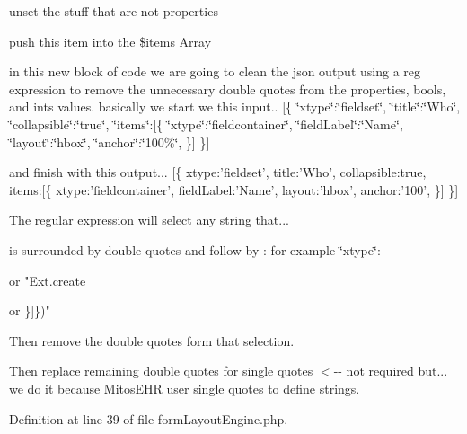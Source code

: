 unset the stuff that are not properties

push this item into the \$items \-Array

in this new block of code we are going to clean the json output using a reg expression to remove the unnecessary double quotes from the properties, bools, and ints values. basically we start we this input.. \mbox{[}\{ \char`\"{}xtype\char`\"{}\-:\char`\"{}fieldset\char`\"{}, \char`\"{}title\char`\"{}\-:\char`\"{}\-Who\char`\"{}, \char`\"{}collapsible\char`\"{}\-:\char`\"{}true\char`\"{}, \char`\"{}items\char`\"{}\-:\mbox{[}\{ \char`\"{}xtype\char`\"{}\-:\char`\"{}fieldcontainer\char`\"{}, \char`\"{}field\-Label\char`\"{}\-:\char`\"{}\-Name\char`\"{}, \char`\"{}layout\char`\"{}\-:\char`\"{}hbox\char`\"{}, \char`\"{}anchor\char`\"{}\-:\char`\"{}100\%\char`\"{}, \}\mbox{]} \}\mbox{]}

and finish with this output... \mbox{[}\{ xtype\-:'fieldset', title\-:'\-Who', collapsible\-:true, items\-:\mbox{[}\{ xtype\-:'fieldcontainer', field\-Label\-:'\-Name', layout\-:'hbox', anchor\-:'100', \}\mbox{]} \}\mbox{]}

\-The regular expression will select any string that...

is surrounded by double quotes and follow by \-: for example \char`\"{}xtype\char`\"{}\-:

or "\-Ext.\-create

or \}\mbox{]}\})"

\-Then remove the double quotes form that selection.

\-Then replace remaining double quotes for single quotes $<$-\/-\/ not required but... we do it because \-Mitos\-E\-H\-R user single quotes to define strings.

\-Definition at line 39 of file form\-Layout\-Engine.\-php.


